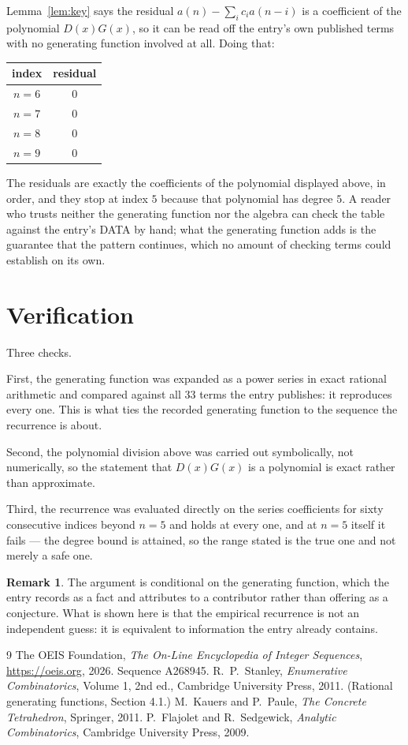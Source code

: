 \documentclass[11pt,a4paper]{article}
\theoremstyle{plain}
\theoremstyle{definition}
\newtheorem{remark}[theorem]{Remark}
\begin{document}
Lemma~\ref{lem:key} says the residual $a(n)-\sum_ic_ia(n-i)$ is a coefficient of the
polynomial $D(x)G(x)$, so it can be read off the entry's own published terms with no
generating function involved at all. Doing that:
\begin{center}
\begin{tabular}{cc}
index & residual \\ \hline
$n=6$ & $0$ \\
$n=7$ & $0$ \\
$n=8$ & $0$ \\
$n=9$ & $0$
\end{tabular}
\end{center}
The residuals are exactly the coefficients of the polynomial displayed above, in order, and
they stop at index $5$ because that polynomial has degree $5$. A reader who trusts
neither the generating function nor the algebra can check the table against the entry's DATA
by hand; what the generating function adds is the guarantee that the pattern continues, which
no amount of checking terms could establish on its own.

\section{Verification}

Three checks.

First, the generating function was expanded as a power series in exact rational arithmetic and
compared against all $33$ terms the entry publishes: it reproduces every one. This is
what ties the recorded generating function to the sequence the recurrence is about.

Second, the polynomial division above was carried out symbolically, not numerically, so the
statement that $D(x)G(x)$ is a polynomial is exact rather than approximate.

Third, the recurrence was evaluated directly on the series coefficients for sixty consecutive
indices beyond $n=5$ and holds at every one, and at $n=5$ itself it fails --- the
degree bound is attained, so the range stated is the true one and not merely a safe one.

\begin{remark}
The argument is conditional on the generating function, which the entry records as a fact and
attributes to a contributor rather than offering as a conjecture. What is shown here is that
the empirical recurrence is not an independent guess: it is equivalent to information the
entry already contains.
\end{remark}

\begin{thebibliography}{9}
 The OEIS Foundation, \emph{The On-Line Encyclopedia of Integer
Sequences}, \url{https://oeis.org}, 2026. Sequence A268945.
 R.~P.~Stanley, \emph{Enumerative Combinatorics}, Volume 1, 2nd ed.,
Cambridge University Press, 2011. (Rational generating functions, Section 4.1.)
 M.~Kauers and P.~Paule, \emph{The Concrete Tetrahedron}, Springer, 2011.
 P.~Flajolet and R.~Sedgewick, \emph{Analytic Combinatorics}, Cambridge
University Press, 2009.
\end{thebibliography}
\end{document}
